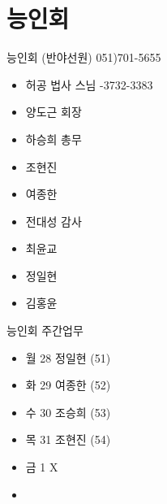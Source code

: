 \documentclass[aspectratio=1610,20pt,xcolor=pdftex,dvipsnames,table,handout]{beamer}
\begin{document}
		\section{능인회}
		\begin{frame} [t,plain]


			\begin{block} {능인회 (반야선원) 051)701-5655 }
			\setlength{\leftmargini}{1em}			
			\begin{itemize}
				\item 허공 법사 스님 	-3732-3383
				\item 양도근 회장	\hrulefill
				\item 하승희 총무	\hrulefill
				\item 조현진 	\hrulefill
				\item 여종한	\hrulefill
				\item 전대성 감사	\hrulefill
				\item 최윤교 	\hrulefill
				\item 정일현	\hrulefill
				\item 김홍윤	\hrulefill
			\end{itemize}
			\end{block}						

			\begin{block} {능인회 주간업무 }					%
			\setlength{\leftmargini}{1em}			
			\begin{itemize}



				\item 월 28 \hrulefill 정일현 (51)
				\item 화 29 \hrulefill 여종한 (52)
				\item 수 30 \hrulefill 조승희 (53)
				\item 목 31 \hrulefill 조현진 (54)
				\item 금 1  \hrulefill X

				\item 
			\end{itemize}
			\end{block}						

		\end{frame}					
\end{document}
